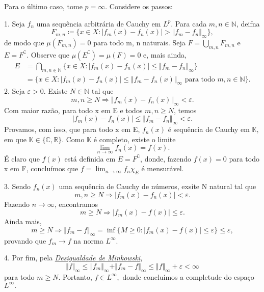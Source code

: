 \documentclass[MeasureTheory/measure_theory.tex]{subfiles}
\begin{document}
\begin{proof*}
	Para o último caso, tome \(p=\infty\). Considere os passos:

	1. Seja \(f_{n}\) uma sequência arbitrária de Cauchy em \(L^{p}.\) Para cada \(m, n\in \mathbb{N}\), deifna
	\[
		F_{m, n}\coloneqq \{x\in X: |f_{m}(x) - f_{n}(x)| > \Vert f_{m}-f_{n} \Vert_{\infty}\},
	\]
	de modo que \(\mu (F_{m, n})=0\) para todo m, n naturais. Seja \(F = \bigcup_{m, n}^{}F_{m, n}\) e \(E = F ^{\complement}\). Observe que \(\mu (E ^{\complement}) = \mu (F) = 0\) e, mais ainda,
	\begin{align*}
		E & =\bigcap_{m, n\in \mathbb{N}}^{}\{x\in X: |f_{m}(x) - f_{n}(x)| \leq \Vert f_{m}-f_{n} \Vert_{\infty}\}            \\
		  & =\{x\in X: |f_{m}(x) - f_{n}(x)| \leq \Vert f_{m} - f_{n}(x) \Vert_{\infty}\text{ para todo }m, n\in \mathbb{N}\}.
	\end{align*}
	2. Seja \(\varepsilon  > 0\). Existe \(N\in \mathbb{N}\) tal que
	\[
		m, n\geq N \Rightarrow \Vert f_{m}(x) - f_{n}(x) \Vert_{\infty} < \varepsilon .
	\]
	Com maior razão, para todo x em E e todos \(m, n\geq N\), temos
	\[
		|f_{m}(x) - f_{n}(x)|\leq \Vert f_{m} - f_{n} \Vert_{\infty} < \varepsilon .
	\]
	Provamos, com isso, que para todo x em E, \(f_{n}(x)\) é sequência de Cauchy em \(\mathbb{K},\) em que \(\mathbb{K}\in \{\mathbb{C}, \mathbb{R}\}\). Como \(\mathbb{K}\) é completo, existe o limite
	\[
		\lim_{n\to \infty}f_{n}(x) = f(x).
	\]
	É claro que \(f(x)\) está definida em \(E = F ^{\complement}\), donde, fazendo \(f(x) = 0\) para todo x em F, concluímos que \(f = \lim_{n\to \infty}f_{n}\chi_{E}\) é mensurável.

	3. Sendo \(f_{n}(x)\) uma sequência de Cauchy de números, exsite N natural tal que
	\[
		m, n \geq N \Rightarrow |f_{m}(x) - f_{n}(x)| < \varepsilon .
	\]
	Fazendo \(n\to \infty\), encontramos
	\[
		m\geq N \Rightarrow |f_{m}(x) - f(x)|\leq \varepsilon .
	\]
	Ainda mais,
	\[
		m\geq N \Rightarrow \Vert f_{m}-f \Vert_{\infty} = \inf_{}\{M\geq 0: |f_{m}(x) - f(x)|\leq \varepsilon \}\leq \varepsilon,
	\]
	provando que \(f_m\to f\) na norma \(L^{\infty}.\)

	4. Por fim, pela \hyperlink{minkowski}{\textit{Desigualdade de Minkowski}},
	\[
		\Vert f \Vert_{\infty}\leq \Vert f_{m} \Vert_{\infty} + \Vert f_m - f \Vert_{\infty}\leq \Vert f \Vert_{\infty} + \varepsilon  < \infty
	\]
	para todo \(m\geq N\). Portanto, \(f\in L^{\infty},\) donde concluímos a completude do espaço \(L^{\infty}.\) \qedsymbol

\end{proof*}
\end{document}
